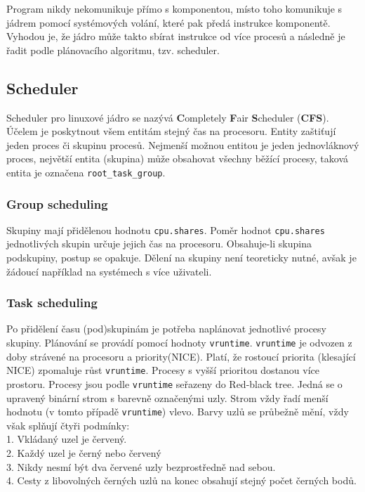 \documentclass[12pt,a4paper,twoside,]{article}
\begin{document}
{{{{{{{Program nikdy nekomunikuje přímo s komponentou, místo toho komunikuje s jádrem pomocí systémových volání, které pak předá instrukce komponentě. Vyhodou je, že jádro může takto sbírat instrukce od více procesů a následně je řadit podle plánovacího algoritmu, tzv. scheduler.

\subsection{\textsf{Scheduler}}
Scheduler pro linuxové jádro se nazývá {\bf C}ompletely {\bf F}air {\bf S}cheduler ({\bf CFS}). Účelem je poskytnout všem entitám stejný čas na procesoru. Entity zaštiťují jeden proces či skupinu procesů. Nejmenší možnou entitou je jeden jednovláknový proces, největší entita (skupina) může obsahovat všechny běžící procesy, taková entita je označena \texttt{root\_task\_group}. 
\subsubsection{\textsf{Group scheduling}}
Skupiny mají přidělenou hodnotu \texttt{cpu.shares}. Poměr hodnot \texttt{cpu.shares} jednotlivých skupin určuje jejich čas na procesoru. Obsahuje-li skupina podskupiny, postup se opakuje. Dělení na skupiny není teoreticky nutné, avšak je žádoucí například na systémech s více uživateli.

\subsubsection{\textsf{Task scheduling}}
Po přidělení času (pod)skupinám je potřeba naplánovat jednotlivé procesy skupiny. Plánování se provádí pomocí hodnoty \texttt{vruntime}. \texttt{vruntime} je odvozen z doby strávené na procesoru a priority(NICE). Platí, že rostoucí priorita (klesající NICE) zpomaluje růst \texttt{vruntime}. Procesy s vyšší prioritou dostanou více prostoru. Procesy jsou podle \texttt{vruntime} seřazeny do Red-black tree. Jedná se o upravený binární strom s barevně označenými uzly. Strom vždy řadí menší hodnotu (v tomto případě \texttt{vruntime}) vlevo. Barvy uzlů se průbežně mění, vždy však splňují čtyři podmínky:\\
1. Vkládaný uzel je červený.\\2. Každý uzel je černý nebo červený\\3. Nikdy nesmí být dva červené uzly bezprostředně nad sebou.\\4. Cesty z libovolných černých uzlů na konec obsahují stejný počet černých bodů. \\ 

}}}}}}}
\end{document}
